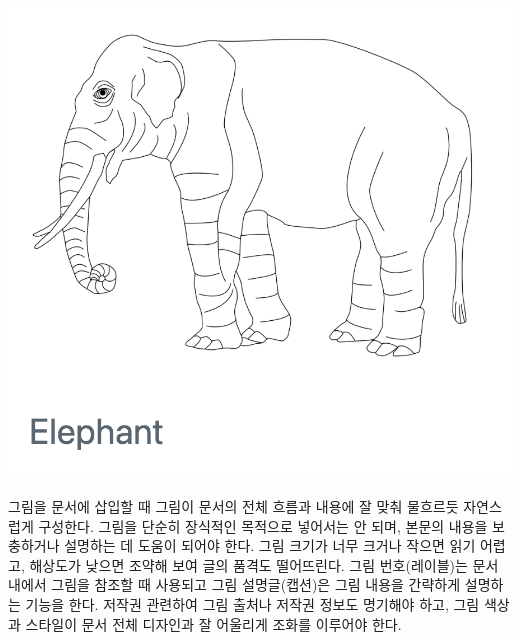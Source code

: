 \documentclass[
  letterpaper,
]{book}
\newenvironment{Shaded}{\begin{snugshade}}{\end{snugshade}}
\newcommand{\AttributeTok}[1]{\textcolor[rgb]{0.40,0.45,0.13}{#1}}
\newcommand{\FunctionTok}[1]{\textcolor[rgb]{0.28,0.35,0.67}{#1}}
\newcommand{\NormalTok}[1]{\textcolor[rgb]{0.00,0.23,0.31}{#1}}
\newcommand{\OtherTok}[1]{\textcolor[rgb]{0.00,0.23,0.31}{#1}}
\newcommand{\SpecialCharTok}[1]{\textcolor[rgb]{0.37,0.37,0.37}{#1}}
\newcommand{\StringTok}[1]{\textcolor[rgb]{0.13,0.47,0.30}{#1}}
\begin{document}
\begin{longtable}[]
\includegraphics{images/figure_html.png} \\
\end{longtable}

그림을 문서에 삽입할 때 그림이 문서의 전체 흐름과 내용에 잘 맞춰
물흐르듯 자연스럽게 구성한다. 그림을 단순히 장식적인 목적으로 넣어서는
안 되며, 본문의 내용을 보충하거나 설명하는 데 도움이 되어야 한다. 그림
크기가 너무 크거나 작으면 읽기 어렵고, 해상도가 낮으면 조약해 보여 글의
품격도 떨어뜨린다. 그림 번호(레이블)는 문서 내에서 그림을 참조할 때
사용되고 그림 설명글(캡션)은 그림 내용을 간략하게 설명하는 기능을 한다.
저작권 관련하여 그림 출처나 저작권 정보도 명기해야 하고, 그림 색상과
스타일이 문서 전체 디자인과 잘 어울리게 조화를 이루어야 한다.

\begin{Shaded}
\end{Shaded}
\end{document}
